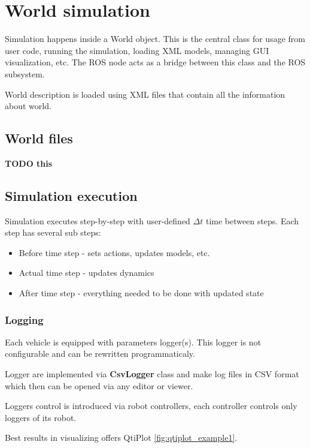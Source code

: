 \documentclass[a4paper,11pt]{article}
\begin{document}
\newpage

\section{World simulation}
Simulation happens inside a World object.
This is the central class for usage from user code, running the simulation, loading XML models, managing GUI visualization, etc.
The ROS node acts as a bridge between this class and the ROS subsystem.

World description is loaded using XML files that contain all the information about world.

\subsection{World files}
\textbf{TODO this}
\newpage


\subsection{Simulation execution}
Simulation executes step-by-step with user-defined $\Delta t$ time between steps.
Each step has several sub steps:
\begin{itemize}
\item Before time step - sets actions, updates models, etc.
\item Actual time step - updates dynamics
\item After time step - everything needed to be done with updated state
\end{itemize}

\subsubsection{Logging}

Each vehicle is equipped with parameters logger(s). This logger is not configurable and can be rewritten programmaticaly. 

Logger are implemented via \textbf{CsvLogger} class and make log files in CSV format which then can be opened via any editor or viewer. 

Loggers control is introduced via robot controllers, each controller controls only loggers of its robot. 

Best results in visualizing offers QtiPlot \ref{fig:qtiplot_example1}.
\end{document}
